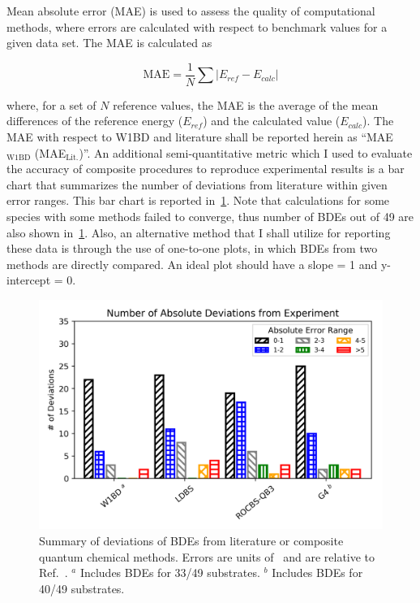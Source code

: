 

Mean absolute error (MAE) is used to assess the quality of computational methods, where errors are calculated with respect to benchmark values for a given data set.\cite{Savin2014} The MAE is calculated as

\begin{equation}
  \mathrm{MAE} = \frac{1}{N} \sum | E_{ref} - E_{calc}|
\end{equation}

\noindent where, for a set of $N$ reference values, the MAE is the average of the mean differences of the reference energy ($E_{ref}$) and the calculated value ($E_{calc}$). The MAE with respect to W1BD and literature shall be reported herein as ``MAE$_{\mathrm{W1BD}}$ (MAE$_{\mathrm{Lit.}}$)''. An additional semi-quantitative metric which I used to evaluate the accuracy of composite procedures to reproduce experimental results is a bar chart that summarizes the number of deviations from literature within given error ranges. This bar chart is reported in~\ref{fig:maebarchart}. Note that calculations for some species with some methods failed to converge, thus number of BDEs out of 49 are also shown in~\ref{fig:maebarchart}. Also, an alternative method that I shall utilize for reporting these data is through the use of one-to-one plots, in which BDEs from two methods are directly compared. An ideal plot should have a slope = 1 and y-intercept = 0.

\begin{figure}[!htbp]
  \centering
  \includegraphics[width=\textwidth]{figures/bde-barchart}
  \caption[Summary of deviations of BDEs from literature for composite quantum chemical methods.]{Summary of deviations of BDEs from literature or composite quantum chemical methods. Errors are units of \kcalmol\ and are relative to Ref.~\protect{}. $^a$ Includes BDEs for 33/49 substrates. $^b$ Includes BDEs for 40/49 substrates.}
  \label{fig:maebarchart}
\end{figure}

